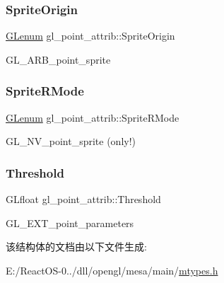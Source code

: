 \subsubsection{\texorpdfstring{Sprite\+Origin}{SpriteOrigin}}
{\footnotesize\ttfamily \hyperlink{interfacevoid}{G\+Lenum} gl\+\_\+point\+\_\+attrib\+::\+Sprite\+Origin}

G\+L\+\_\+\+A\+R\+B\+\_\+point\+\_\+sprite \mbox{\label{structgl__point__attrib_af28e863ac779b2efb028cd0847709091}} 
\subsubsection{\texorpdfstring{Sprite\+R\+Mode}{SpriteRMode}}
{\footnotesize\ttfamily \hyperlink{interfacevoid}{G\+Lenum} gl\+\_\+point\+\_\+attrib\+::\+Sprite\+R\+Mode}

G\+L\+\_\+\+N\+V\+\_\+point\+\_\+sprite (only!) \mbox{\label{structgl__point__attrib_a4b06d29b0c143b8a22ec651c227ceaec}} 
\subsubsection{\texorpdfstring{Threshold}{Threshold}}
{\footnotesize\ttfamily G\+Lfloat gl\+\_\+point\+\_\+attrib\+::\+Threshold}

G\+L\+\_\+\+E\+X\+T\+\_\+point\+\_\+parameters 

该结构体的文档由以下文件生成\+:\begin{DoxyCompactItemize}
\item 
E\+:/\+React\+O\+S-\/0../dll/opengl/mesa/main/\hyperlink{mtypes_8h}{mtypes.\+h}\end{DoxyCompactItemize}
